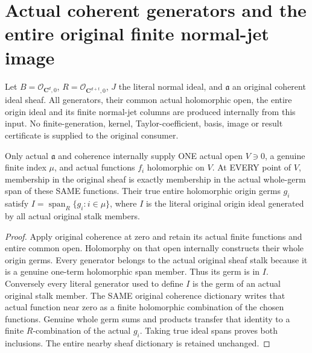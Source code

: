\section{Actual coherent generators and the entire original finite normal-jet image}
Let $B=\mathcal O_{\mathbf C^d,0}$, $R=\mathcal O_{\mathbf C^{d+t},0}$,
$J$ the literal normal ideal, and $\mathfrak a$ an original coherent ideal sheaf.
All generators, their common actual holomorphic open, the entire origin ideal
and its finite normal-jet columns are produced internally from this input.
No finite-generation, kernel, Taylor-coefficient, basis, image or result
certificate is supplied to the original consumer.

\begin{theorem}
\label{hir:relative-normal-original-jet-internal-generators}
\leanok
{}
Only actual $\mathfrak a$ and coherence internally supply ONE actual open
$V\ni0$, a genuine finite index $\mu$, and actual functions $f_i$ holomorphic
on $V$. At EVERY point of $V$, membership in the original sheaf is exactly
membership in the actual whole-germ span of these SAME functions. Their true
entire holomorphic origin germs $g_i$ satisfy
$I=\operatorname{span}_R\{g_i:i\in\mu\}$, where $I$ is the literal original
origin ideal generated by all actual original stalk members.
\end{theorem}
\begin{proof}
Apply original coherence at zero and retain its actual finite functions and
entire common open. Holomorphy on that open internally constructs their whole
origin germs. Every generator belongs to the actual original sheaf stalk
because it is a genuine one-term holomorphic span member. Thus its germ is in
$I$. Conversely every literal generator used to define $I$ is the germ of an
actual original stalk member. The SAME original coherence dictionary writes
that actual function near zero as a finite holomorphic combination of the
chosen functions. Genuine whole germ sums and products transfer that identity
to a finite $R$-combination of the actual $g_i$. Taking true ideal spans proves
both inclusions. The entire nearby sheaf dictionary is retained unchanged.
\end{proof}

